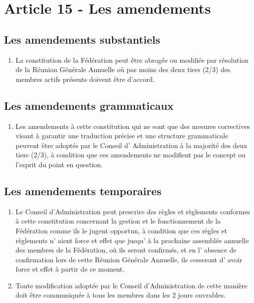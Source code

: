 \section{Article 15 - Les amendements}
\label{article-15-les-amendements}

\subsection{Les amendements substantiels}
\label{les-amendements-substantiels}

\begin{enumerate}
 \item
  La constitution de la Fédération peut être abrogée ou modifiée par résolution de la Réunion Générale Annuelle où pas moins des deux tiers (2/3) des membres actifs présents doivent être d'accord.
\end{enumerate}

\subsection{Les amendements grammaticaux}
\label{les-amendements-grammaticaux}

\begin{enumerate}
 \item
  Les amendements à cette constitution qui ne sont que des mesures correctives visant à garantir une traduction précise et une structure grammaticale peuvent être adoptés par le Conseil d' Administration à la majorité des deux tiers (2/3), à condition que ces amendements ne modifient pas le concept ou l'esprit du point en question.
\end{enumerate}

\subsection{Les amendements temporaires}
\label{les-amendements-temporaires}

\begin{enumerate}
 \item
  Le Conseil d'Administration peut prescrire des règles et règlements conformes à cette constitution concernant la gestion et le fonctionnement de la Fédération comme ils le jugent opportun, à condition que ces règles et règlements n' aient force et effet que jusqu' à la prochaine assemblée annuelle des membres de la Fédération, où ils seront confirmés, et en l' absence de confirmation lors de cette Réunion Générale Annuelle, ils cesseront d' avoir force et effet à partir de ce moment.
 \item
  Toute modification adoptée par le Conseil d'Administration de cette manière doit être communiquée à tous les membres dans les 2 jours ouvrables.
\end{enumerate}

